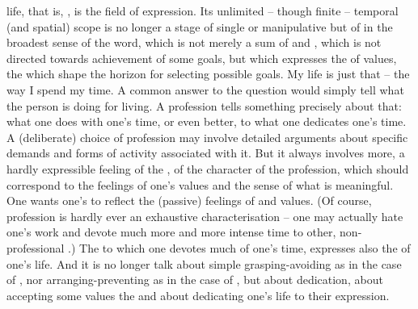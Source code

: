 
\pa\label{pa:Zweck}  life, that is, , is the field of
 expression.  Its unlimited -- though finite -- temporal (and spatial)
scope is no longer a stage of single  or manipulative  but
of  in the broadest sense of the word,  which is not
merely a sum of  and , which is not directed towards
achievement of some goals, but which expresses the  of values, the
 which shape the horizon for selecting possible goals. {My life} is just that -- the way I spend
my time.  A common answer to the question  would simply tell what
the person is doing for living.  A profession tells something precisely about
that: what one does with one's time, or even better, to what one dedicates one's
time.  A (deliberate) choice of profession may involve detailed arguments about
specific demands and forms of activity associated with it.  But it always
involves more, a hardly expressible feeling of the , of the
character of the profession, which should correspond to the feelings of one's
values and the sense of what is meaningful.  One wants one's  to
reflect the (passive) feelings of  and values.  (Of course,
profession is hardly ever an exhaustive characterisation -- one may actually
hate one's work and devote much more and more intense time to other,
non-professional .)  The  to which one devotes much
of one's time, expresses also the  of one's life.  And it is no
longer talk about simple grasping-avoiding as in the case of , nor
arranging-preventing as in the case of , but about dedication,
about accepting some values  the  and about
dedicating one's life to their expression.

